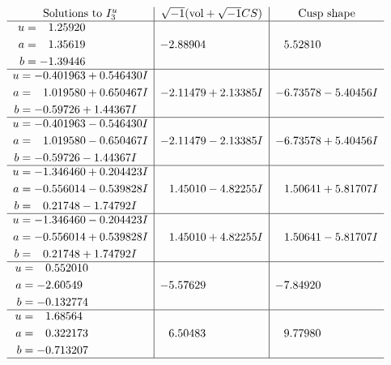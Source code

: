 \documentclass[1p]{elsarticle_modified}
\theoremstyle{definition}
\newcommand{\I}{\sqrt{-1}}
\begin{document}
$$\begin{array}{c|c|c}  
\text{Solutions to }I^u_{3}& \I (\text{vol} + \sqrt{-1}CS) & \text{Cusp shape}\\
 \hline 
\begin{aligned}
u &= \phantom{-}1.25920\phantom{ +0.000000I} \\
a &= \phantom{-}1.35619\phantom{ +0.000000I} \\
b &= -1.39446\phantom{ +0.000000I}\end{aligned}
 & -2.88904\phantom{ +0.000000I} & \phantom{-}5.52810\phantom{ +0.000000I} \\ \hline\begin{aligned}
u &= -0.401963 + 0.546430 I \\
a &= \phantom{-}1.019580 + 0.650467 I \\
b &= -0.59726 + 1.44367 I\end{aligned}
 & -2.11479 + 2.13385 I & -6.73578 - 5.40456 I \\ \hline\begin{aligned}
u &= -0.401963 - 0.546430 I \\
a &= \phantom{-}1.019580 - 0.650467 I \\
b &= -0.59726 - 1.44367 I\end{aligned}
 & -2.11479 - 2.13385 I & -6.73578 + 5.40456 I \\ \hline\begin{aligned}
u &= -1.346460 + 0.204423 I \\
a &= -0.556014 - 0.539828 I \\
b &= \phantom{-}0.21748 - 1.74792 I\end{aligned}
 & \phantom{-}1.45010 - 4.82255 I & \phantom{-}1.50641 + 5.81707 I \\ \hline\begin{aligned}
u &= -1.346460 - 0.204423 I \\
a &= -0.556014 + 0.539828 I \\
b &= \phantom{-}0.21748 + 1.74792 I\end{aligned}
 & \phantom{-}1.45010 + 4.82255 I & \phantom{-}1.50641 - 5.81707 I \\ \hline\begin{aligned}
u &= \phantom{-}0.552010\phantom{ +0.000000I} \\
a &= -2.60549\phantom{ +0.000000I} \\
b &= -0.132774\phantom{ +0.000000I}\end{aligned}
 & -5.57629\phantom{ +0.000000I} & -7.84920\phantom{ +0.000000I} \\ \hline\begin{aligned}
u &= \phantom{-}1.68564\phantom{ +0.000000I} \\
a &= \phantom{-}0.322173\phantom{ +0.000000I} \\
b &= -0.713207\phantom{ +0.000000I}\end{aligned}
 & \phantom{-}6.50483\phantom{ +0.000000I} & \phantom{-}9.77980\phantom{ +0.000000I}\\
 \hline 
 \end{array}$$\newpage
\end{document}
